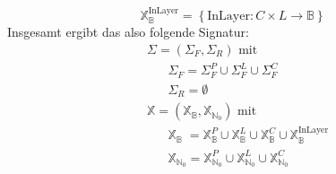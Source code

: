 \[
    \mathbb{X}_{\mathbb{B}}^{\text{InLayer}} = \left\{ \text{InLayer}: C \times L \rightarrow \mathbb{B} \right\}
\]
Insgesamt ergibt das also folgende Signatur:
\begin{align*}
    &\hspace{0pt} \Sigma = \left( \Sigma_F, \Sigma_R \right) \text{ mit } \\
    &\hspace{20pt} \Sigma_F = \Sigma_{F}^{P} \cup \Sigma_{F}^{L} \cup \Sigma_{F}^{C} \\
    &\hspace{20pt} \Sigma_R = \emptyset \\
    &\hspace{0pt} \mathbb{X} = (\mathbb{X}_{\mathbb{B}}, \mathbb{X}_{\mathbb{N}_0}) \text{ mit} \\
    &\hspace{20pt} \mathbb{X}_{\mathbb{B}_{\phantom{0}}} = \mathbb{X}^{P}_{\mathbb{B}} \cup \mathbb{X}^{L}_{\mathbb{B}} \cup \mathbb{X}^{C}_{\mathbb{B}} \cup \mathbb{X}^{\text{InLayer}}_{\mathbb{B}} \\
    &\hspace{20pt} \mathbb{X}_{\mathbb{N}_0} = \mathbb{X}^{P}_{\mathbb{N}_0} \cup \mathbb{X}^{L}_{\mathbb{N}_0} \cup \mathbb{X}^{C}_{\mathbb{N}_0}
\end{align*}

